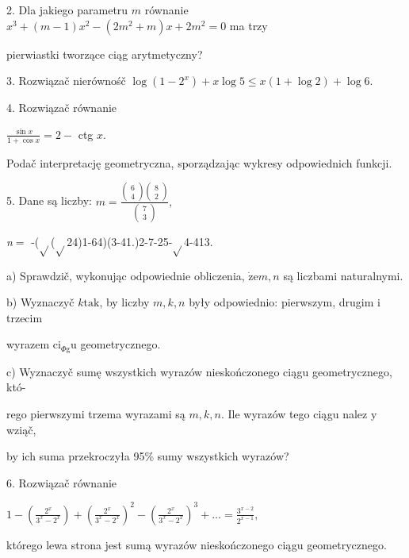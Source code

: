 \documentclass[a4paper,12pt]{article}
\begin{document}
2. Dla jakiego parametru $m$ równanie $x^{3}+(m-1)x^{2}-(2m^{2}+m)x+2m^{2}=0$ ma trzy

pierwiastki tworzące ciąg arytmetyczny?

3. Rozwiązač nierównośč $\log(1-2^{x})+x\log 5\leq x(1+\log 2)+\log 6.$

4. Rozwiązač równanie

$\displaystyle \frac{\sin x}{1+\cos x}=2-$ ctg $x.$

Podač interpretację geometryczna, sporządzając wykresy odpowiednich funkcji.

5. Dane są liczby: $m=\displaystyle \frac{\left(\begin{array}{l}
6\\
4
\end{array}\right)\left(\begin{array}{l}
8\\
2
\end{array}\right)}{\left(\begin{array}{l}
7\\
3
\end{array}\right)},$

{\it n}$=$ -($\sqrt{}$($\sqrt{}$24)1-64)(3-41.)2-7-25-$\sqrt{}$4-413.

a) Sprawdzič, wykonując odpowiednie obliczenia, $\dot{\mathrm{z}}\mathrm{e}m, n$ są liczbami naturalnymi.

b) Wyznaczyč $k\mathrm{t}\mathrm{a}\mathrm{k}$, by liczby $m, k, n$ były odpowiednio: pierwszym, drugim $\mathrm{i}$ trzecim

wyrazem $\mathrm{c}\mathrm{i}_{\Phi \mathrm{g}}\mathrm{u}$ geometrycznego.

c) Wyznaczyč sumę wszystkich wyrazów nieskończonego ciągu geometrycznego, któ-

rego pierwszymi trzema wyrazami są $m, k, n$. Ile wyrazów tego ciągu nalez $\mathrm{y}$ wziąč,

by ich suma przekroczyła 95\% sumy wszystkich wyrazów?

6. Rozwiązač równanie

$1-(\displaystyle \frac{2^{x}}{3^{x}-2^{x}})+(\frac{2^{x}}{3^{x}-2^{x}})^{2}-(\frac{2^{x}}{3^{x}-2^{x}})^{3}+\ldots=\frac{3^{x-2}}{2^{x-1}},$

którego lewa strona jest sumą wyrazów nieskończonego ciągu geometrycznego.
\end{document}
